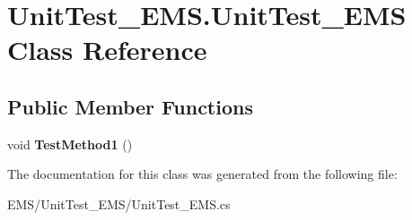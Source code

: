 \hypertarget{class_unit_test___e_m_s_1_1_unit_test___e_m_s}{\section{Unit\-Test\-\_\-\-E\-M\-S.\-Unit\-Test\-\_\-\-E\-M\-S Class Reference}
\label{class_unit_test___e_m_s_1_1_unit_test___e_m_s}
}
\subsection*{Public Member Functions}
\begin{DoxyCompactItemize}
\item 
\hypertarget{class_unit_test___e_m_s_1_1_unit_test___e_m_s_a07ba9eb3bf9e7defd0149735cdabaa4c}{void {\bfseries Test\-Method1} ()}\label{class_unit_test___e_m_s_1_1_unit_test___e_m_s_a07ba9eb3bf9e7defd0149735cdabaa4c}

\end{DoxyCompactItemize}


The documentation for this class was generated from the following file\-:\begin{DoxyCompactItemize}
\item 
E\-M\-S/\-Unit\-Test\-\_\-\-E\-M\-S/Unit\-Test\-\_\-\-E\-M\-S.\-cs\end{DoxyCompactItemize}
